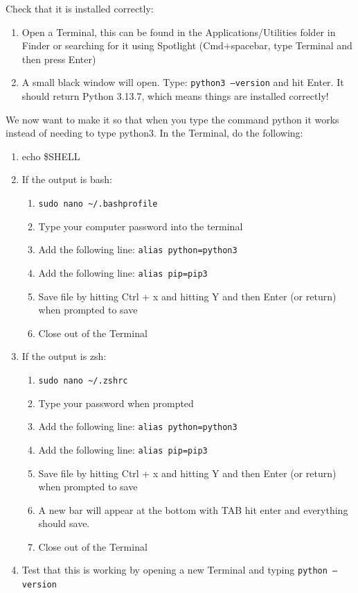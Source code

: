 \documentclass[12pt]{article}
\begin{document}
Check that it is installed correctly:
\begin{enumerate}
\item Open a Terminal, this can be found in the Applications/Utilities folder in Finder or searching for it using Spotlight (Cmd+spacebar, type Terminal and then press Enter)
\item A small black window will open. Type: \texttt{python3 --version} and hit Enter. It should return Python 3.13.7, which means things are installed correctly!
\end{enumerate}

We now want to make it so that when you type the command python it works instead of needing to type python3.
In the Terminal, do the following:
\begin{enumerate}
\item echo \$SHELL
\item If the output is bash:
  \begin{enumerate}
  \item \texttt{sudo nano \textasciitilde{}/.bash\textunderscore profile}
  \item Type your computer password into the terminal
  \item Add the following line: \texttt{alias python=python3}
  \item Add the following line: \texttt{alias pip=pip3}
  \item Save file by hitting Ctrl + x and hitting Y and then Enter (or return) when prompted to save
  \item Close out of the Terminal
  \end{enumerate}
\item If the output is zsh:
  \begin{enumerate}
  \item \texttt{sudo nano \textasciitilde{}/.zshrc}
    \item Type your password when prompted
  \item Add the following line: \texttt{alias python=python3}
  \item Add the following line: \texttt{alias pip=pip3}
  \item Save file by hitting Ctrl + x and hitting Y and then Enter (or return) when prompted to save
  \item A new bar will appear at the bottom with TAB hit enter and everything should save.
  \item Close out of the Terminal
  \end{enumerate}
\item Test that this is working by opening a new Terminal and typing \texttt{python --version}
\end{enumerate}
\end{document}
